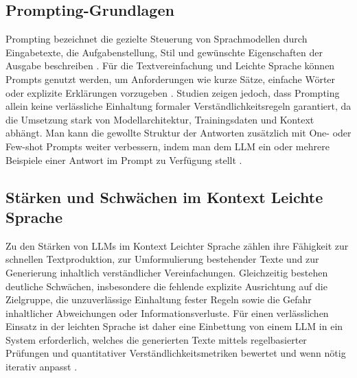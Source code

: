 \subsection{Prompting-Grundlagen}
Prompting bezeichnet die gezielte Steuerung von Sprachmodellen durch Eingabetexte, die Aufgabenstellung, Stil und gewünschte Eigenschaften der Ausgabe beschreiben \cite[S. 51-56]{xiao_foundations_2025}.
Für die Textvereinfachung und Leichte Sprache können Prompts genutzt werden, um Anforderungen wie kurze Sätze, einfache Wörter oder explizite Erklärungen vorzugeben \cite[S. 102]{xiao_foundations_2025}. Studien zeigen jedoch, dass Prompting allein keine verlässliche Einhaltung formaler Verständlichkeitsregeln garantiert, da die Umsetzung stark von Modellarchitektur, Trainingsdaten und Kontext abhängt.
Man kann die gewollte Struktur der Antworten zusätzlich mit One- oder Few-shot Prompts weiter verbessern, indem man dem LLM ein oder mehrere Beispiele einer Antwort im Prompt zu Verfügung stellt  \cite[S. 6-7]{brown_language_2020}.

\subsection{Stärken und Schwächen im Kontext Leichte Sprache}
Zu den Stärken von LLMs im Kontext Leichter Sprache zählen ihre Fähigkeit zur schnellen Textproduktion, zur Umformulierung bestehender Texte und zur Generierung inhaltlich verständlicher Vereinfachungen.
Gleichzeitig bestehen deutliche Schwächen, insbesondere die fehlende explizite Ausrichtung auf die Zielgruppe, die unzuverlässige Einhaltung fester Regeln sowie die Gefahr inhaltlicher Abweichungen oder Informationsverluste.
Für einen verlässlichen Einsatz in der leichten Sprache ist daher eine Einbettung von einem LLM in ein System erforderlich, welches die generierten Texte mittels regelbasierter Prüfungen und quantitativer Verständlichkeitsmetriken bewertet und wenn nötig iterativ anpasst \cite[S. 95-99]{maas_handbuch_2018}.